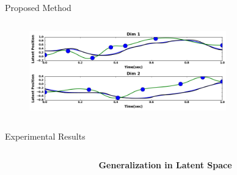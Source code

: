 \documentclass[final,hyperref={pdfpagelabels=false}]{beamer}
\begin{document}
\begin{frame}[t]
\begin{columns}[t]
\begin{column}{0.96\linewidth}
\begin{block}{Proposed Method}
\begin{columns}[t]
\begin{column}{0.33\linewidth}
          \begin{figure}
            \centering
            \includegraphics[width=0.8\textwidth]{trajectory.png}
          \end{figure}
        \end{column}
      \end{columns}
    \end{block}
  \end{column}

  \begin{column}{0.02\linewidth}\end{column}
\end{columns}

\begin{block}{Experimental Results}

  \begin{columns}[t]
    \begin{column}{0.02\linewidth}\end{column}

    \begin{column}{0.4\linewidth}
      \centering \textbf{\large Generalization in Latent Space}\\


\end{column}
\end{columns}
\end{block}
\end{frame}
\end{document}

